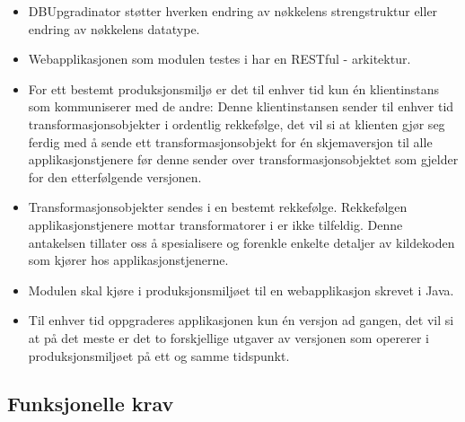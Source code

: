 \begin{itemize}
  \item DBUpgradinator støtter hverken endring av nøkkelens strengstruktur eller endring av nøkkelens datatype.
  \item Webapplikasjonen som modulen testes i har en RESTful - arkitektur.
  \item For ett bestemt produksjonsmiljø er det til enhver tid kun én klientinstans som kommuniserer med de andre: Denne klientinstansen sender til enhver tid transformasjonsobjekter i ordentlig rekkefølge, det vil si at klienten gjør seg ferdig med å sende ett transformasjonsobjekt for én skjemaversjon til alle applikasjonstjenere før denne sender over transformasjonsobjektet som gjelder for den etterfølgende versjonen.
  \item Transformasjonsobjekter sendes i en bestemt rekkefølge. Rekkefølgen applikasjonstjenere mottar transformatorer i er ikke tilfeldig. Denne antakelsen tillater oss å spesialisere og forenkle enkelte detaljer av kildekoden som kjører hos applikasjonstjenerne.
  \item Modulen skal kjøre i produksjonsmiljøet til en webapplikasjon skrevet i Java.
  \item Til enhver tid oppgraderes applikasjonen kun én versjon ad gangen, det vil si at på det meste er det to forskjellige utgaver av versjonen som opererer i produksjonsmiljøet på ett og samme tidspunkt.
\end{itemize}

\subsection{Funksjonelle krav} \label{funq}

